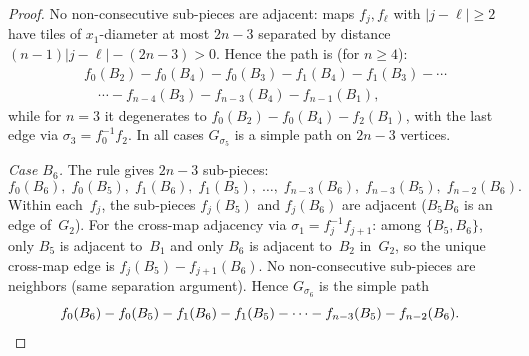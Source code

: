 \documentclass{amsart}
\theoremstyle{definition}
\theoremstyle{remark}
\begin{document}
\begin{proof}
No non-consecutive sub-pieces are adjacent: maps $f_j, f_\ell$ with
$|j - \ell| \ge 2$ have tiles of $x_1$-diameter at most $2n{-}3$
separated by distance $(n{-}1)|j - \ell| - (2n{-}3) > 0$.
Hence the path is (for $n \ge 4$):
\begin{align*}
  &f_0(B_2) - f_0(B_4) - f_0(B_3) - f_1(B_4) - f_1(B_3) - \cdots\\
  &\quad\cdots - f_{n-4}(B_3) - f_{n-3}(B_4) - f_{n-1}(B_1),
\end{align*}
while for $n = 3$ it degenerates to
$f_0(B_2) - f_0(B_4) - f_2(B_1)$, with the last edge via
$\sigma_3 = f_0^{-1} f_2$.
In all cases $G_{\sigma_5}$ is a simple path on $2n{-}3$ vertices.

\emph{Case $B_6$.}
The rule gives $2n{-}3$ sub-pieces:
\[
  f_0(B_6),\; f_0(B_5),\; f_1(B_6),\; f_1(B_5),\;
  \ldots,\; f_{n-3}(B_6),\; f_{n-3}(B_5),\; f_{n-2}(B_6).
\]
Within each~$f_j$, the sub-pieces $f_j(B_5)$ and $f_j(B_6)$ are
adjacent ($B_5 B_6$ is an edge of~$G_2$).
For the cross-map adjacency via $\sigma_1 = f_j^{-1}f_{j+1}$:
among $\{B_5, B_6\}$, only $B_5$ is adjacent to~$B_1$ and only
$B_6$ is adjacent to~$B_2$ in~$G_2$, so the unique cross-map edge
is $f_j(B_5) - f_{j+1}(B_6)$.
No non-consecutive sub-pieces are neighbors (same separation argument).
Hence $G_{\sigma_6}$ is the simple path
\[
  f_0(B_6) - f_0(B_5) - f_1(B_6) - f_1(B_5) - \cdots
  - f_{n-3}(B_5) - f_{n-2}(B_6).
  \qedhere
\]
\end{proof}
\end{document}
